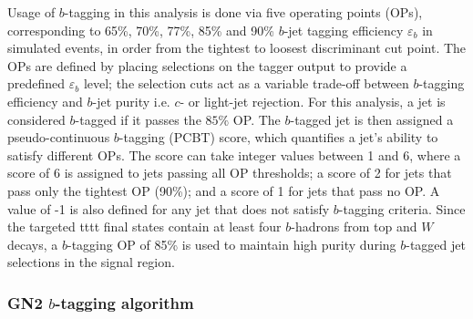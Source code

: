 \documentclass[../thesis.tex]{subfiles}
\begin{document}
Usage of $b$-tagging in this analysis is done via five operating points (\acs{OP}s), corresponding to 65\%, 70\%, 77\%, 85\% and 90\% $b$-jet tagging efficiency $\varepsilon_b$ in simulated \ttbar events, in order from the tightest to loosest discriminant cut point.
The \acs{OP}s are defined by placing selections on the tagger output to provide a predefined $\varepsilon_b$ level; the selection cuts act as a variable trade-off between $b$-tagging efficiency and $b$-jet purity i.e. $c$- or light-jet rejection. For this analysis, a jet is considered $b$-tagged if it passes the $85\%$ \acs{OP}. The $b$-tagged jet is then assigned a pseudo-continuous $b$-tagging (\acs{PCBT}) score, which quantifies a jet's ability to satisfy different \acs{OP}s. The score can take integer values between 1 and 6, where a score of 6 is assigned to jets passing all \acs{OP} thresholds; a score of 2 for jets that pass only the tightest \acs{OP} (90\%); and a score of 1 for jets that pass no \acs{OP}. A value of -1 is also defined for any jet that does not satisfy $b$-tagging criteria. Since the targeted \acs{tttt} final states contain at least four $b$-hadrons from top and $W$ decays, a $b$-tagging \acs{OP} of 85\% is used to maintain high purity during $b$-tagged jet selections in the signal region.

\subsubsection*{GN2 $b$-tagging algorithm}
\label{sec:gn2}
\end{document}
